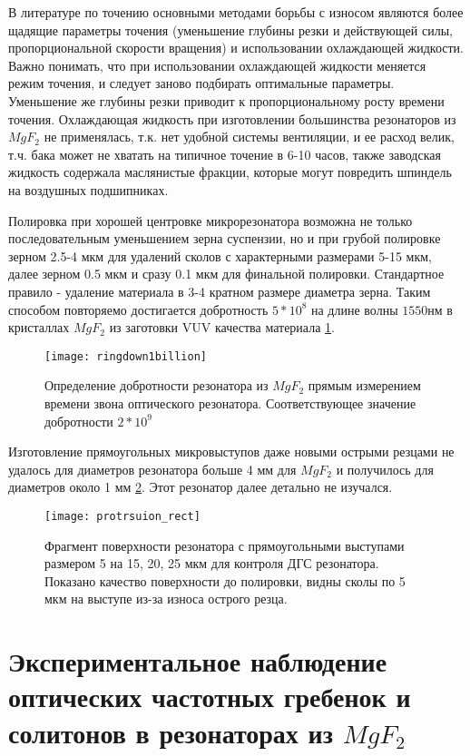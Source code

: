 В литературе по точению основными методами борьбы с износом являются более щадящие параметры точения (уменьшение глубины резки и действующей силы, пропорциональной скорости вращения) и использовании охлаждающей жидкости. Важно понимать, что при использовании охлаждающей жидкости меняется режим точения, и следует заново подбирать оптимальные параметры. Уменьшение же глубины резки приводит к пропорциональному росту времени точения. Охлаждающая жидкость при изготовлении большинства резонаторов из $MgF_2$ не применялась, т.к. нет удобной системы вентиляции, и ее расход велик, т.ч. бака может не хватать на типичное точение в 6-10 часов, также заводская жидкость содержала маслянистые фракции, которые могут повредить шпиндель на воздушных подшипниках.

Полировка при хорошей центровке микрорезонатора возможна не только последовательным уменьшением зерна суспензии, но и при грубой полировке зерном 2.5-4 мкм для удалений сколов с характерными размерами 5-15 мкм, далее зерном 0.5 мкм и сразу 0.1 мкм для финальной полировки. Стандартное правило - удаление материала в 3-4 кратном размере диаметра зерна. Таким способом повторяемо достигается добротность $5*10^8$ на длине волны $1550 нм$ в кристаллах $MgF_2$ из заготовки VUV качества материала \ref{ringdown}.

\begin{figure}[ht]
\centering
  \texttt{[image: ringdown1billion]}
  \caption{Определение добротности резонатора из $MgF_2$ прямым измерением времени звона оптического резонатора. Соответствующее значение добротности $2*10^9$}
  \label{ringdown}
\end{figure}


Изготовление прямоугольных микровыступов даже новыми острыми резцами не удалось для диаметров резонатора больше 4 мм для $MgF_2$ и получилось для диаметров около 1 мм \ref{protrsuion_rect}. Этот резонатор далее детально не изучался.

\begin{figure}[ht]
\centering
  \texttt{[image: protrsuion\_rect]}
  \caption{Фрагмент поверхности резонатора с прямоугольными выступами размером 5 на 15, 20, 25 мкм для контроля ДГС резонатора. Показано качество поверхности до полировки, видны сколы по 5 мкм на выступе из-за износа острого резца.}
  \label{protrsuion_rect}
\end{figure}

\section{Экспериментальное наблюдение оптических частотных гребенок и солитонов в резонаторах из $MgF_2$}


